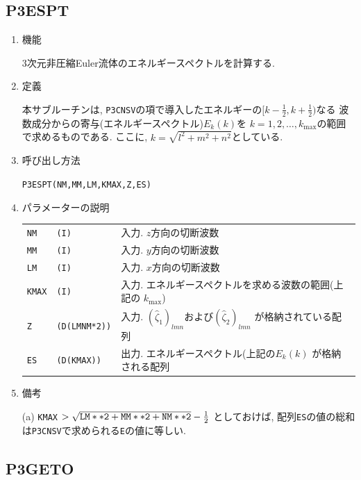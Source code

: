 \documentclass[a4j,fleqn]{jarticle}
\begin{document}

\subsection{P3ESPT}

\begin{enumerate}

\item 機能

3次元非圧縮Euler流体のエネルギースペクトルを計算する.

\item 定義

本サブルーチンは,
{\tt P3CNSV}の項で導入したエネルギーの$[k-\frac12,k+\frac12)$なる
波数成分からの寄与(エネルギースペクトル)$E_k(k)$を
$k=1,2,\ldots,k_{\max}$の範囲で求めるものである. ここに, 
$k=\sqrt{l^2+m^2+n^2}$としている.

\item 呼び出し方法

{\tt P3ESPT(NM,MM,LM,KMAX,Z,ES)}
  
\item パラメーターの説明

\begin{tabular}{lll}
{\tt NM} & {\tt (I)} & 入力. $z$方向の切断波数\\
{\tt MM} & {\tt (I)} & 入力. $y$方向の切断波数\\
{\tt LM} & {\tt (I)} & 入力. $x$方向の切断波数\\
{\tt KMAX} & {\tt (I)} & 入力. エネルギースペクトルを求める波数の範囲(上記の
$k_{\max}$)\\
{\tt Z} & {\tt (D(LMNM*2))} &
 入力. $(\hat{\zeta}_1)_{lmn}$および$(\hat{\zeta}_2)_{lmn}$
  が格納されている配列\\
{\tt ES} & {\tt (D(KMAX))} & 出力. エネルギースペクトル(上記の$E_k(k)$
が格納される配列
\end{tabular}

\item 備考

(a) {\tt KMAX} $> \sqrt{\tt LM**2+MM**2+NM**2}-\frac12$ としておけば,
配列{\tt ES}の値の総和は{\tt P3CNSV}で求められる{\tt E}の値に等しい.

\end{enumerate}


\subsection{P3GETO}
\end{document}
